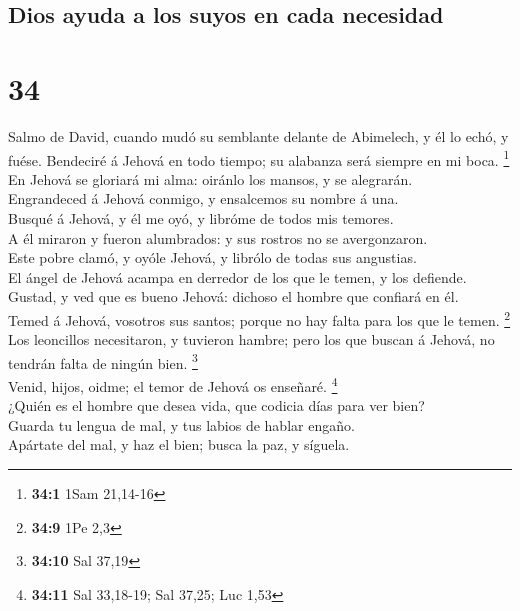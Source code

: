 \hypertarget{dios-ayuda-a-los-suyos-en-cada-necesidad}{%
\subsection{Dios ayuda a los suyos en cada
necesidad}\label{dios-ayuda-a-los-suyos-en-cada-necesidad}}

\hypertarget{section-33}{%
\section{34}\label{section-33}}

 Salmo de David, cuando mudó su semblante delante de
Abimelech, y él lo echó, y fuése. Bendeciré á Jehová en todo tiempo; su
alabanza será siempre en mi boca. \footnote{\textbf{34:1} 1Sam 21,14-16}\\
 En Jehová se gloriará mi alma: oiránlo los mansos, y se
alegrarán.\\
 Engrandeced á Jehová conmigo, y ensalcemos su nombre á
una.\\
 Busqué á Jehová, y él me oyó, y libróme de todos mis
temores.\\
 A él miraron y fueron alumbrados: y sus rostros no se
avergonzaron.\\
 Este pobre clamó, y oyóle Jehová, y librólo de todas sus
angustias.\\
 El ángel de Jehová acampa en derredor de los que le
temen, y los defiende.\\
 Gustad, y ved que es bueno Jehová: dichoso el hombre que
confiará en él.\\
 Temed á Jehová, vosotros sus santos; porque no hay falta
para los que le temen. \footnote{\textbf{34:9} 1Pe 2,3}\\
 Los leoncillos necesitaron, y tuvieron hambre; pero los
que buscan á Jehová, no tendrán falta de ningún bien. \footnote{\textbf{34:10}
  Sal 37,19}\\
 Venid, hijos, oidme; el temor de Jehová os enseñaré.
\footnote{\textbf{34:11} Sal 33,18-19; Sal 37,25; Luc 1,53}\\
 ¿Quién es el hombre que desea vida, que codicia días
para ver bien?\\
 Guarda tu lengua de mal, y tus labios de hablar
engaño.\\
 Apártate del mal, y haz el bien; busca la paz, y
síguela.\\
